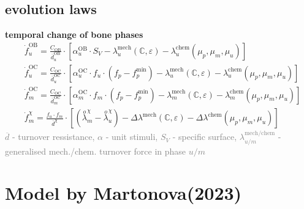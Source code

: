 \documentclass[%
aspectratio=169,  %
]{beamer}
\begin{document}
\subsection{evolution laws}
\begin{frame}
\textbf{temporal change of bone phases}
\begin{subequations}
	\begin{align}
		& \dot{f}_u^\text{OB} = \frac{C_\text{OB}}{\overline{d}_u^\text{OB}} \cdot [\alpha_u^\text{OB} \cdot S_V - \lambda^\text{mech}_u(\mathbb{C}, \varepsilon) - \lambda^\text{chem}_u(\mu_p, \mu_m, \mu_u) ] \\
		&\dot{f}_u^\text{OC} = \frac{C_\text{OC}}{\overline{d}_u^\text{OC}} \cdot [\alpha_u^\text{OC} \cdot f_u \cdot (f_p - f_p^\text{min}) - \lambda^\text{mech}_u(\mathbb{C}, \varepsilon) - \lambda^\text{chem}_u(\mu_p, \mu_m, \mu_u)] \\
		& \dot{f}_m^\text{OC} =  \frac{C_\text{OC}}{\overline{d}_m^\text{OC}} \cdot [\alpha_m^\text{OC} \cdot f_m \cdot (f_p - f_p^\text{min}) - \lambda^\text{mech}_m(\mathbb{C}, \varepsilon) - \lambda^\text{chem}_m (\mu_p, \mu_m, \mu_u)] \\
		& \dot{f}_m^\chi = \frac{f_u\cdot f_m}{\overline{d}^\chi} \cdot [(\overset{o}{\lambda}^{\chi}_m-\overset{o}{\lambda}^{\chi}_u) - \Delta  \lambda^\text{mech}(\mathbb{C}, \varepsilon) - \Delta  \lambda^\text{chem}(\mu_p, \mu_m, \mu_u) ]
	\end{align}
\end{subequations}
\textcolor{gray}{$\overline{d}$ - turnover ressistance, $\alpha$ - unit stimuli, $S_V$ - specific surface, $\lambda^\text{mech/chem}_{u/m}$ - generalised mech./chem. turnover force in phase $u/m$ }
\end{frame}

\section{Model by Martonova(2023)}
\end{document}
